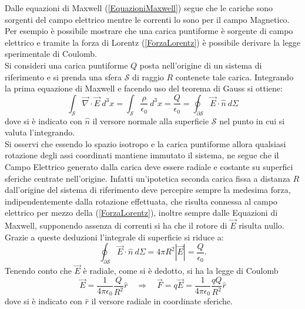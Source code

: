 Dalle equazioni di Maxwell (\ref{EquazioniMaxwell}) segue che le cariche sono sorgenti del campo 
elettrico mentre le correnti lo sono per 
il campo Magnetico. Per esempio è possibile mostrare che una carica puntiforme è sorgente di campo elettrico e 
tramite la forza di Lorentz (\ref{ForzaLorentz}) è possibile derivare la legge sperimentale di Coulomb.\\
Si consideri una carica puntiforme $Q$ posta nell'origine di un sistema di riferimento e si prenda una sfera $\mathcal{S}$ di raggio $R$ 
contenete tale carica. Integrando la prima equazione di Maxwell e facendo uso del teorema di Gauss si ottiene:
\begin{equation*}
	\int_\mathcal{S}\vec{\nabla}\cdot\vec{E}\ d^3x=\int_\mathcal{S}\frac{\rho}{\epsilon_0}\ d^3x=\frac{Q}{\epsilon_0}=\oint_{\partial\mathcal{S}}\vec{E}\cdot\hat{n}\ d\Sigma
\end{equation*}
dove si è indicato con $\hat{n}$ il versore normale alla superficie $\mathcal{S}$ nel punto in cui si valuta l'integrando.\\
Si osservi che essendo lo spazio 
isotropo e la carica puntiforme allora qualsiasi rotazione degli assi coordinati mantiene immutato il sistema, ne segue che 
il Campo Elettrico generato dalla carica deve essere radiale e costante su superfici sferiche centrate nell'origine. Infatti un'ipotetica seconda carica 
fissa a distanza $R$ dall'origine del sistema di riferimento deve percepire sempre la medesima forza, indipendentemente dalla rotazione effettuata, 
che risulta connessa al campo elettrico per mezzo della (\ref{ForzaLorentz}), inoltre sempre dalle Equazioni di Maxwell, supponendo assenza di correnti 
si ha che il rotore di $\vec{E}$ risulta nullo. Grazie a queste deduzioni l'integrale di superficie si riduce a:
\begin{equation*}
	\oint_{\partial\mathcal{S}}\vec{E}\cdot\hat{n}\ d\Sigma=4\pi R^2|\vec{E}|=\frac{Q}{\epsilon_0}.
\end{equation*}	
Tenendo conto che $\vec{E}$ è radiale, come si è dedotto, si ha la legge di Coulomb
\begin{equation}
	\vec{E}=\frac{1}{4\pi\epsilon_0}\frac{Q}{R^2}\hat{r} \quad \Rightarrow \quad \vec{F}=q\vec{E}=\frac{1}{4\pi\epsilon_0}\frac{qQ}{R^2}\hat{r}
\end{equation} 
dove si è indicato con $\hat{r}$ il versore radiale in coordinate sferiche.\\

